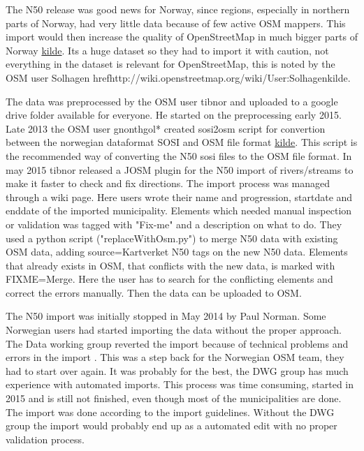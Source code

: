 The N50 release was good news for Norway, since regions, especially in northern parts of Norway, had very little data because of few active OSM mappers. This import would then increase the quality of OpenStreetMap in much bigger parts of Norway \href{http://www.digi.no/artikler/kartskatt-til-alle/286539}{kilde}. Its a huge dataset so they had to import it with caution, not everything in the dataset is relevant for OpenStreetMap, this is noted by the OSM user Solhagen href{http://wiki.openstreetmap.org/wiki/User:Solhagen}{kilde}. %

The data was preprocessed by the OSM user tibnor and uploaded to a google drive folder available for everyone. He started on the preprocessing early 2015. Late 2013 the OSM user gnonthgol* created sosi2osm script for convertion between the norwegian dataformat SOSI and OSM file format \href{https://lists.nuug.no/pipermail/kart/2013-October/004314.html}{kilde}. This script is the recommended way of converting the N50 sosi files to the OSM file format. In may 2015 tibnor released a JOSM plugin for the N50 import of rivers/streams to make it faster to check and fix directions. The import process was managed through a wiki page. Here users wrote their name and progression, startdate and enddate of the imported municipality. Elements which needed manual inspection or validation was tagged with "Fix-me" and a description on what to do. They used a python script ("replaceWithOsm.py") to merge N50 data with existing OSM data, adding source=Kartverket N50 tags on the new N50 data. Elements that already exists in OSM, that conflicts with the new data, is marked with FIXME=Merge. Here the user has to search for the conflicting elements and correct the errors manually. Then the data can be uploaded to OSM. 

The N50 import was initially stopped in May 2014 by Paul Norman. Some Norwegian users had started importing the data without the proper approach. The Data working group reverted the import because of technical problems and errors in the import \cite{Didriksen2014}. This was a step back for the Norwegian OSM team, they had to start over again. It was probably for the best, the DWG group has much experience with automated imports. This process was time consuming, started in 2015 and is still not finished, even though most of the municipalities are done. The import was done according to the import guidelines. Without the DWG group the import would probably end up as a automated edit with no proper validation process. 


